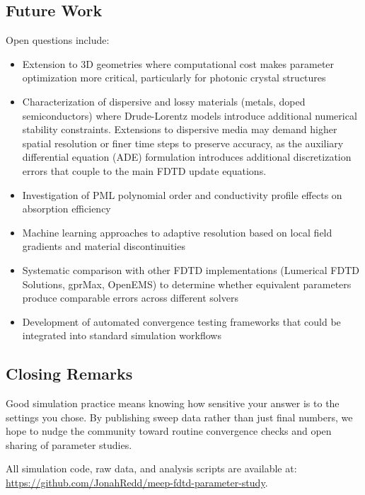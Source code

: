 \documentclass[12pt, a4paper]{article}
\newcommand{\fdtd}{\textsc{FDTD}}
\begin{document}
\subsection{Future Work}

Open questions include:

\begin{itemize}
    \item Extension to 3D geometries where computational cost makes parameter optimization more critical, particularly for photonic crystal structures \citep{Joannopoulos2008}
    \item Characterization of dispersive and lossy materials (metals, doped semiconductors) where Drude-Lorentz models introduce additional numerical stability constraints. Extensions to dispersive media may demand higher spatial resolution or finer time steps to preserve accuracy, as the auxiliary differential equation (ADE) formulation introduces additional discretization errors that couple to the main FDTD update equations.
    \item Investigation of PML polynomial order and conductivity profile effects on absorption efficiency
    \item Machine learning approaches to adaptive resolution based on local field gradients and material discontinuities
    \item Systematic comparison with other \fdtd{} implementations (Lumerical FDTD Solutions, gprMax, OpenEMS) to determine whether equivalent parameters produce comparable errors across different solvers \citep{Silva2021}
    \item Development of automated convergence testing frameworks that could be integrated into standard simulation workflows \citep{Kumar2015}
\end{itemize}

\subsection{Closing Remarks}

Good simulation practice means knowing how sensitive your answer is to the settings you chose. By publishing sweep data rather than just final numbers, we hope to nudge the community toward routine convergence checks and open sharing of parameter studies.

All simulation code, raw data, and analysis scripts are available at: \url{https://github.com/JonahRedd/meep-fdtd-parameter-study}.

\end{document}
